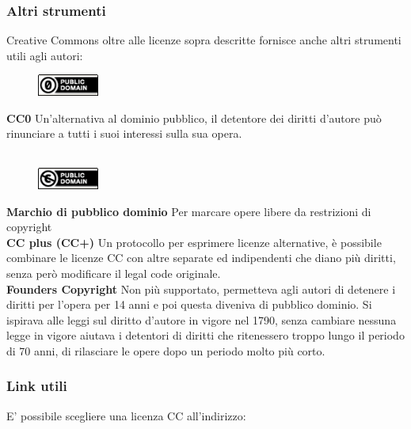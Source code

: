 \subsubsection{Altri strumenti}

Creative Commons oltre alle licenze sopra descritte fornisce anche altri strumenti utili agli autori:\\

\begin{figure}
    \includegraphics[width=20mm]{images/CC0}
\end{figure}

\noindent \textbf{CC0} Un'alternativa al dominio pubblico, il detentore dei diritti d'autore può rinunciare a tutti i suoi interessi sulla sua opera.\\ \\

\begin{figure}
    \includegraphics[width=20mm]{images/cc_PD}
\end{figure}

\noindent \textbf{Marchio di pubblico dominio} Per marcare opere libere da restrizioni di copyright\\

\textbf{CC plus (CC+)} Un protocollo  per esprimere licenze alternative, è possibile combinare le licenze CC con altre separate ed indipendenti che diano più diritti, senza però modificare il legal code originale.\\

\textbf{Founders Copyright} Non più supportato, permetteva agli autori di detenere i diritti per l'opera per 14 anni e poi questa diveniva di pubblico dominio. Si ispirava alle leggi sul diritto d'autore in vigore nel 1790, senza cambiare nessuna legge in vigore aiutava i detentori di diritti che ritenessero troppo lungo il periodo di 70 anni, di rilasciare le opere dopo un periodo molto più corto.

\subsubsection{Link utili}

E' possibile scegliere una licenza CC all'indirizzo: \\

